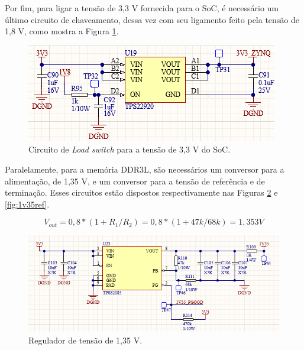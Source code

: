 Por fim, para ligar a tensão de 3,3 V fornecida para o SoC, é necessário um último circuito de chaveamento, dessa vez com seu ligamento feito pela tensão de 1,8 V, como mostra a Figura \ref{fig:sw2}.

\begin{figure}[H]
    \centering
    \includegraphics[scale=1]{images/sw2.png}
    \caption{Circuito de \textit{Load switch} para a tensão de 3,3 V do SoC.}
    \label{fig:sw2}
\end{figure}

Paralelamente, para a memória DDR3L, são necessários um conversor para a alimentação, de 1,35 V, e um conversor para a tensão de referência e de terminação. Esses circuitos estão dispostos respectivamente nas Figuras \ref{fig:1v35supp} e \ref{fig:1v35ref}.

\begin{equation}
	V_{out} = 0,8 * (1 + R_1/R_2) = 0,8 * (1+ 47k/68k) = 1,353 V
\end{equation} 

\begin{figure}[H]
    \centering
    \includegraphics[scale=0.8]{images/1v35supp.png}
    \caption{Regulador de tensão de 1,35 V.}
    \label{fig:1v35supp}
\end{figure}

